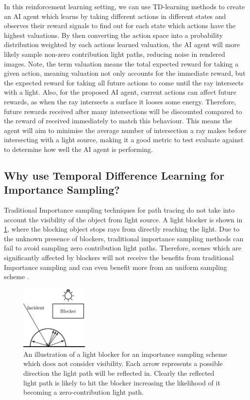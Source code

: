 \documentclass[../dissertation.tex]{subfiles}
\begin{document}
In this reinforcement learning setting, we can use TD-learning methods to create 
an AI agent which learns by taking different actions in different states and observes 
their reward signals to find out for each state which actions have the highest valuations.
By then converting the action space into a probability distribution weighted by each
actions learned valuation, the AI agent will more likely sample non-zero contribution 
light paths, reducing noise in rendered images. Note, the term valuation means the 
total expected reward for taking a given action, meaning valuation not only accounts 
for the immediate reward, but the expected reward for taking all future actions to come 
until the ray intersects with a light. Also, for the proposed AI agent, current actions 
can affect future rewards, as when the ray intersects a surface it looses some energy. 
Therefore, future rewards received after many intersections will be discounted 
compared to the reward of received immediately to match this behaviour. This means 
the agent will aim to minimise the average number of intersection a ray makes before 
intersecting with a light source, making it a good metric to test evaluate against to 
determine how well the AI agent is performing.

\subsection{Why use Temporal Difference Learning for Importance Sampling?}

Traditional Importance sampling techniques for path tracing do not take into account 
the visibility of the object from light source. A light blocker is shown in \ref{fig:blocker}, where the 
blocking object stops rays from directly reaching the light. Due to the unknown 
presence of blockers, traditional importance sampling methods can fail to avoid 
sampling zero contribution light paths. Therefore, scenes which are significantly 
affected by blockers will not receive the benefits from traditional Importance sampling 
and can even benefit more from an uniform sampling scheme 
\cite{ramamoorthi2012theory}.\\

\begin{figure}[h!]
\begin{center}
\includegraphics[width=0.3\textwidth]{images/light_blocker.png}    
\end{center}
\caption{An illustration of a light blocker for an importance sampling scheme which does not consider visibility. Each arrow represents a possible direction the light path will be reflected in. Clearly the reflected light path is likely to hit the blocker increasing the likelihood of it becoming a zero-contribution light path.}
\label{fig:blocker}
\end{figure}
\end{document}
